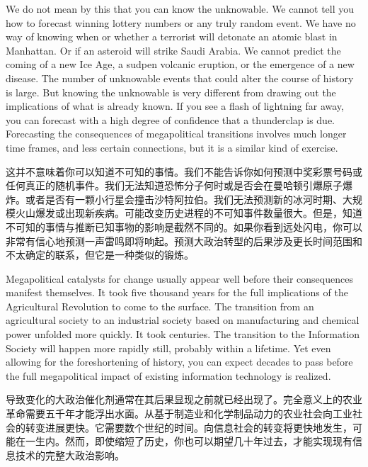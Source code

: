 \begin{Parallel}{97mm}{45mm}
  \ParallelLText
  {We do not mean by this that you can know the unknowable. We cannot tell you how to forecast winning lottery numbers or any truly random event. We have no way of knowing when or whether a terrorist will detonate an atomic blast in Manhattan. Or if an asteroid will strike Saudi Arabia. We cannot predict the coming of a new Ice Age, a sudpen volcanic eruption, or the emergence of a new disease. The number of unknowable events that could alter the course of history is large. But knowing the unknowable is very different from drawing out the implications of what is already known. If you see a flash of lightning far away, you can forecast with a high degree of confidence that a thunderclap is due. Forecasting the consequences of megapolitical transitions involves much longer time frames, and less certain connections, but it is a similar kind of exercise.}
  
  \ParallelRText
  {这并不意味着你可以知道不可知的事情。我们不能告诉你如何预测中奖彩票号码或任何真正的随机事件。我们无法知道恐怖分子何时或是否会在曼哈顿引爆原子爆炸。或者是否有一颗小行星会撞击沙特阿拉伯。我们无法预测新的冰河时期、大规模火山爆发或出现新疾病。可能改变历史进程的不可知事件数量很大。但是，知道不可知的事情与推断已知事物的影响是截然不同的。如果你看到远处闪电，你可以非常有信心地预测一声雷鸣即将响起。预测大政治转型的后果涉及更长时间范围和不太确定的联系，但它是一种类似的锻炼。}
  \ParallelPar



  \ParallelLText
  {Megapolitical catalysts for change usually appear well before their consequences manifest themselves. It took five thousand years for the full implications of the Agricultural Revolution to come to the surface. The transition from an agricultural society to an industrial society based on manufacturing and chemical power unfolded more quickly. It took centuries. The transition to the Information Society will happen more rapidly still, probably within a lifetime. Yet even allowing for the foreshortening of history, you can expect decades to pass before the full megapolitical impact of existing information technology is realized.}
  
  \ParallelRText
  {导致变化的大政治催化剂通常在其后果显现之前就已经出现了。完全意义上的农业革命需要五千年才能浮出水面。从基于制造业和化学制品动力的农业社会向工业社会的转变进展更快。它需要数个世纪的时间。向信息社会的转变将更快地发生，可能在一生内。然而，即使缩短了历史，你也可以期望几十年过去，才能实现现有信息技术的完整大政治影响。}
  \ParallelPar


\end{Parallel}
